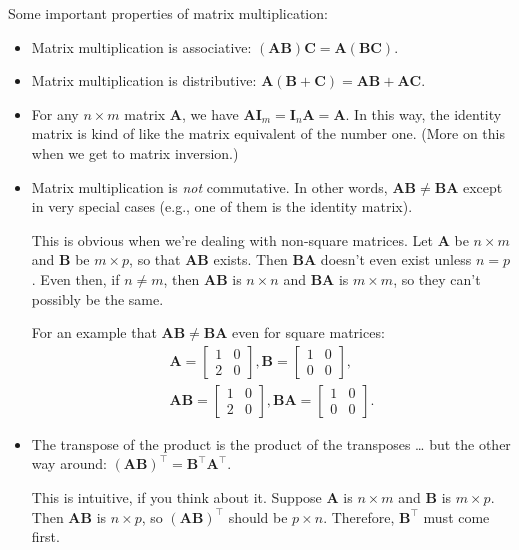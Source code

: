 \documentclass[12pt,oneside,openany]{book}
\begin{document}
Some important properties of matrix multiplication:

\begin{itemize}
\item
  Matrix multiplication is associative:
  \((\mathbf{A} \mathbf{B}) \mathbf{C} = \mathbf{A} (\mathbf{B} \mathbf{C})\).
\item
  Matrix multiplication is distributive:
  \(\mathbf{A} (\mathbf{B} + \mathbf{C}) = \mathbf{A} \mathbf{B} + \mathbf{A} \mathbf{C}\).
\item
  For any \(n \times m\) matrix \(\mathbf{A}\), we have
  \(\mathbf{A} \mathbf{I}_m = \mathbf{I}_n \mathbf{A} = \mathbf{A}\). In
  this way, the identity matrix is kind of like the matrix equivalent of
  the number one. (More on this when we get to matrix inversion.)
\item
  Matrix multiplication is \emph{not} commutative. In other words,
  \(\mathbf{A} \mathbf{B} \neq \mathbf{B} \mathbf{A}\) except in very
  special cases (e.g., one of them is the identity matrix).

  This is obvious when we're dealing with non-square matrices. Let
  \(\mathbf{A}\) be \(n \times m\) and \(\mathbf{B}\) be \(m \times p\),
  so that \(\mathbf{A} \mathbf{B}\) exists. Then
  \(\mathbf{B} \mathbf{A}\) doesn't even exist unless \(n = p\). Even
  then, if \(n \neq m\), then \(\mathbf{A} \mathbf{B}\) is
  \(n \times n\) and \(\mathbf{B} \mathbf{A}\) is \(m \times m\), so
  they can't possibly be the same.

  For an example that
  \(\mathbf{A} \mathbf{B} \neq \mathbf{B} \mathbf{A}\) even for square
  matrices: \[\begin{gathered}
  \mathbf{A} = \begin{bmatrix}
    1 & 0 \\
    2 & 0
  \end{bmatrix},
  \mathbf{B} = \begin{bmatrix}
    1 & 0 \\
    0 & 0
  \end{bmatrix}, \\
  \mathbf{A} \mathbf{B} = \begin{bmatrix}
    1 & 0 \\
    2 & 0
  \end{bmatrix},
  \mathbf{B} \mathbf{A} = \begin{bmatrix}
    1 & 0 \\
    0 & 0
  \end{bmatrix}.
  \end{gathered}
  \]
\item
  The transpose of the product is the product of the transposes \ldots{}
  but the other way around:
  \((\mathbf{A} \mathbf{B})^\top = \mathbf{B}^\top \mathbf{A}^\top\).

  This is intuitive, if you think about it. Suppose \(\mathbf{A}\) is
  \(n \times m\) and \(\mathbf{B}\) is \(m \times p\). Then
  \(\mathbf{A} \mathbf{B}\) is \(n \times p\), so
  \((\mathbf{A} \mathbf{B})^\top\) should be \(p \times n\). Therefore,
  \(\mathbf{B}^\top\) must come first.
\end{itemize}
\end{document}
